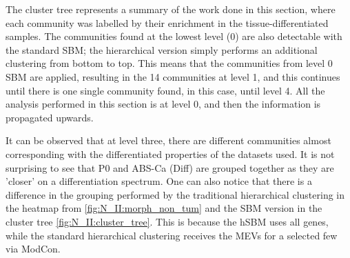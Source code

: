 The cluster tree represents a summary of the work done in this section, where each community was labelled by their enrichment in the tissue-differentiated samples. The communities found at the lowest level (0) are also detectable with the standard SBM; the hierarchical version simply performs an additional clustering from bottom to top. This means that the communities from level 0 SBM are applied, resulting in the 14 communities at level 1, and this continues until there is one single community found, in this case, until level 4. All the analysis performed in this section is at level 0, and then the information is propagated upwards.

It can be observed that at level three, there are different communities almost corresponding with the differentiated properties of the datasets used. It is not surprising to see that P0 and ABS-Ca (Diff) are grouped together as they are 'closer' on a differentiation spectrum. One can also notice that there is a difference in the grouping performed by the traditional hierarchical clustering in the heatmap from \cref{fig:N_II:morph_non_tum} and the SBM version in the cluster tree \cref{fig:N_II:cluster_tree}. This is because the hSBM uses all genes, while the standard hierarchical clustering receives the MEVs for a selected few via ModCon.




